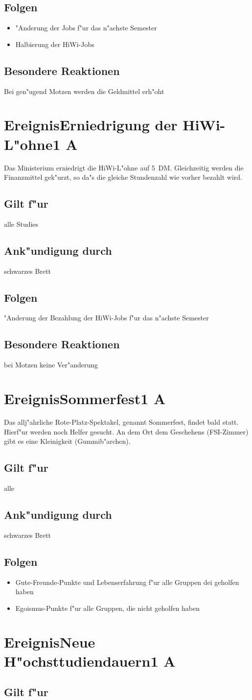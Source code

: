 \documentclass[a4paper,12pt]{article}
\def\Ereignis#1{\newpage\section[#1]{Ereignis\hfil\break#1}}
\def\Ereigniss#1#2{\Ereignis{#1\hfill#2}}
\def\Folgen{\subsection*{Folgen}}
\def\fuer{\subsection*{Gilt f"ur}}
\def\Reaktionen{\subsection*{Besondere Reaktionen}}
\def\Ankuendigung{\subsection*{Ank"undigung durch}}
\begin{document}
\Folgen

\begin{itemize}
\item
"Anderung der Jobs f"ur das n"achste Semester
\item
Halbierung der HiWi-Jobs
\end{itemize}

\Reaktionen

Bei gen"ugend Motzen werden die Geldmittel erh"oht

\Ereigniss{Erniedrigung der HiWi-L"ohne}{1 A}

Das Ministerium erniedrigt die HiWi-L"ohne auf 
5~DM. Gleichzeitig werden die Finanzmittel gek"urzt, so da"s 
die gleiche Stundenzahl wie vorher bezahlt wird.

\fuer

alle Studies

\Ankuendigung

schwarzes Brett

\Folgen

"Anderung der Bezahlung der HiWi-Jobs f"ur das n"achste Semester 

\Reaktionen

bei Motzen keine Ver"anderung
                                                  

\Ereigniss{Sommerfest}{1 A}

Das allj"ahrliche Rote-Platz-Spektakel, genannt Sommerfest, findet 
bald statt. Hierf"ur werden noch Helfer gesucht. An dem Ort dem 
Geschehens (FSI-Zimmer) gibt es eine Kleinigkeit (Gummib"archen).

\fuer

alle

\Ankuendigung

schwarzes Brett

\Folgen

\begin{itemize}
\item
Gute-Freunde-Punkte und Lebenserfahrung f"ur alle Gruppen 
dei geholfen haben
\item
Egoismus-Punkte f"ur alle Gruppen, die nicht geholfen haben
\end{itemize}


\Ereigniss{Neue H"ochsttudiendauern}{1 A}

\fuer
\end{document}
